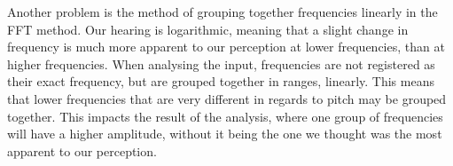 Another problem is the method of grouping together frequencies linearly in the FFT method.
Our hearing is logarithmic, meaning that a slight change in frequency is much more apparent to our perception at lower frequencies, than at higher frequencies.
When analysing the input, frequencies are not registered as their exact frequency, but are grouped together in ranges, linearly.
This means that lower frequencies that are very different in regards to pitch may be grouped together.
This impacts the result of the analysis, where one group of frequencies will have a higher amplitude, without it being the one we thought was the most apparent to our perception.
